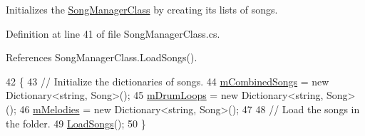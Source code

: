 Initializes the \hyperlink{class_song_manager_class}{Song\+Manager\+Class} by creating its lists of songs. 



Definition at line 41 of file Song\+Manager\+Class.\+cs.



References Song\+Manager\+Class.\+Load\+Songs().


\begin{DoxyCode}
42     \{
43         \textcolor{comment}{// Initialize the dictionaries of songs.}
44         \hyperlink{group___s_m_priv_var_gaf6b4ff41b8da95d10ad3db62df111faa}{mCombinedSongs} = \textcolor{keyword}{new} Dictionary<string, Song>();
45         \hyperlink{group___s_m_priv_var_ga84f25335035755448d11acb9287360f2}{mDrumLoops} = \textcolor{keyword}{new} Dictionary<string, Song>();
46         \hyperlink{group___s_m_priv_var_ga935e80f645d0546003f7df8443b79242}{mMelodies} = \textcolor{keyword}{new} Dictionary<string, Song>();
47 
48         \textcolor{comment}{// Load the songs in the folder.}
49         \hyperlink{group___s_m_priv_func_ga73d6d3b38a160fd73b63b786b9cd384a}{LoadSongs}();
50     \}
\end{DoxyCode}
